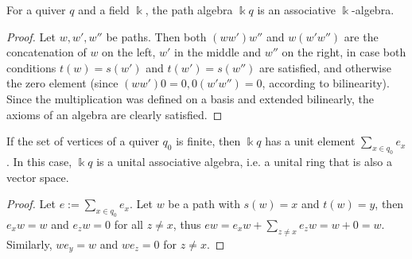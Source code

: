 \begin{lemma}\label{la:path_algebra_is_ass_algebra}
For a quiver $q$ and a field $\Bbbk$, the path algebra $\Bbbk q$ is an associative $\Bbbk$-algebra.
\end{lemma}
\begin{proof}
Let $w, w', w''$ be paths. Then both $(ww')w''$ and $w(w'w'')$ are the concatenation of $w$ on the left,
$w'$ in the middle and $w''$ on the right, in case both conditions $t(w) = s(w')$ and $t(w') = s(w'')$ are satisfied, and
otherwise the zero element (since $(ww')0 = 0, 0(w'w'') = 0$, according to bilinearity).\\
Since the multiplication was defined on a basis and extended bilinearly, the axioms of an algebra are clearly satisfied.
\end{proof}

\begin{lemma}\label{la:unit_in_path_algebra}
If the set of vertices of a quiver $q_{0}$ is finite, then $\Bbbk q$ has a unit element $\sum_{x\in q_{0}} e_{x}$. In this case, $\Bbbk q$ is a unital
associative algebra, i.e. a unital ring that is also a vector space.
\end{lemma}
\begin{proof}
Let $e := \sum_{x\in q_{0}} e_{x}$. Let $w$ be a path with $s(w) = x$ and $t(w) = y$, then $e_{x}w = w$ and $e_{z}w = 0$ for all $z \neq x$,
thus $ew = e_{x}w + \sum_{z\neq x} e_{z}w = w + 0 = w$. Similarly, $we_{y} = w$ and $we_{z} = 0$ for $z \neq x$.
\end{proof}

